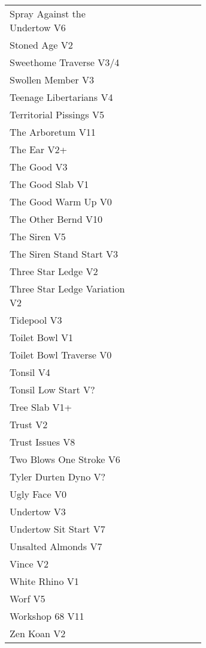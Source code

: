 \begin{flushleft}
\begin{center}
\begin{supertabular}{p{0.65\linewidth}r}
Spray Against the Undertow V6 & \pageref{vr:Spray Against the Undertow} \\
Stoned Age V2 & \pageref{rt:Stoned Age} \\
Sweethome Traverse V3/4 & \pageref{vr:Sweethome Traverse} \\
Swollen Member V3 & \pageref{rt:Swollen Member} \\
Teenage Libertarians V4 & \pageref{rt:Teenage Libertarians} \\
Territorial Pissings V5 & \pageref{rt:Territorial Pissings} \\
The Arboretum V11 & \pageref{rt:The Arboretum} \\
The Ear V2+ & \pageref{rt:The Ear} \\
The Good V3 & \pageref{rt:The Good} \\
The Good Slab V1 & \pageref{rt:The Good Slab} \\
The Good Warm Up V0 & \pageref{rt:The Good Warm Up} \\
The Other Bernd V10 & \pageref{rt:The Other Bernd} \\
The Siren V5 & \pageref{rt:The Siren} \\
The Siren Stand Start V3 & \pageref{vr:The Siren Stand Start} \\
Three Star Ledge V2 & \pageref{rt:Three Star Ledge} \\
Three Star Ledge Variation V2 & \pageref{vr:Three Star Ledge Variation} \\
Tidepool V3 & \pageref{rt:Tidepool} \\
Toilet Bowl V1 & \pageref{rt:Toilet Bowl} \\
Toilet Bowl Traverse V0 & \pageref{rt:Toilet Bowl Traverse} \\
Tonsil V4 & \pageref{rt:Tonsil} \\
Tonsil Low Start V? & \pageref{vr:Tonsil Low Start} \\
Tree Slab V1+ & \pageref{rt:Tree Slab} \\
Trust V2 & \pageref{rt:Trust} \\
Trust Issues V8 & \pageref{rt:Trust Issues} \\
Two Blows One Stroke V6 & \pageref{rt:Two Blows One Stroke} \\
Tyler Durten Dyno V? & \pageref{vr:Tyler Durten Dyno} \\
Ugly Face V0 & \pageref{rt:Ugly Face} \\
Undertow V3 & \pageref{rt:Undertow} \\
Undertow Sit Start V7 & \pageref{vr:Undertow Sit Start} \\
Unsalted Almonds V7 & \pageref{rt:Unsalted Almonds} \\
Vince V2 & \pageref{rt:Vince} \\
White Rhino V1 & \pageref{rt:White Rhino} \\
Worf V5 & \pageref{rt:Worf} \\
Workshop 68 V11 & \pageref{rt:Workshop 68} \\
Zen Koan V2 & \pageref{rt:Zen Koan} \\
\end{supertabular}
\end{center}

\end{flushleft}
